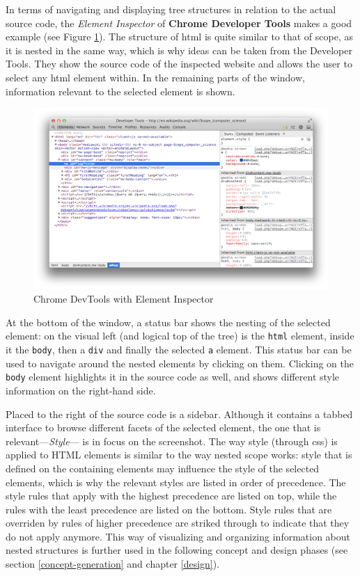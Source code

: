 In terms of navigating and displaying tree structures in relation to the
actual source code, the \emph{Element Inspector} of \textbf{Chrome
Developer Tools} makes a good example (see Figure \ref{fig:devtools}).
The structure of \acs{html} is quite similar to that of scope, as it is
nested in the same way, which is why ideas can be taken from the
Developer Tools. They show the source code of the inspected website and
allows the user to select any \acs{html} element within. In the
remaining parts of the window, information relevant to the selected
element is shown.

\begin{figure}[htbp]
\centering
\includegraphics[keepaspectratio,width=\textwidth,height=0.75\textheight]{img/devtools.png}
\caption{Chrome DevTools with Element Inspector}
\label{fig:devtools}
\end{figure}

At the bottom of the window, a status bar shows the nesting of the
selected element: on the visual left (and logical top of the tree) is
the \texttt{html} element, inside it the \texttt{body}, then a
\texttt{div} and finally the selected \texttt{a} element. This status
bar can be used to navigate around the nested elements by clicking on
them. Clicking on the \texttt{body} element highlights it in the source
code as well, and shows different style information on the right-hand
side.

Placed to the right of the source code is a sidebar. Although it
contains a tabbed interface to browse different facets of the selected
element, the one that is relevant—\emph{Style}— is in focus on the
screenshot. The way style (through \ac{css}) is applied to HTML elements
is similar to the way nested scope works: style that is defined on the
containing elements may influence the style of the selected elements,
which is why the relevant styles are listed in order of precedence. The
style rules that apply with the highest precedence are listed on top,
while the rules with the least precedence are listed on the bottom.
Style rules that are overriden by rules of higher precedence are striked
through to indicate that they do not apply anymore. This way of
visualizing and organizing information about nested structures is
further used in the following concept and design phases (see section
\ref{concept-generation} and chapter \ref{design}).

